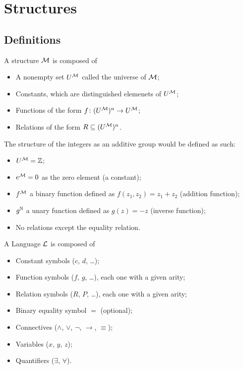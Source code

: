\documentclass[11pt,a4paper]{article}
\renewcommand{\implies}{\rightarrow}
\begin{document}
\section{Structures}
\subsection{Definitions}
\begin{definition}[Strcture]
  A structure $\mathcal{M}$ is composed of
  \begin{itemize}
    \item A nonempty set $U^{\mathcal{M}}$ called the universe of $\mathcal{M}$;
    \item Constants, which are distinguished elemenets of $U^{\mathcal{M}}$;
    \item Functions of the form $f \colon (U^{\mathcal{M}})^n \to U^{\mathcal{M}}$;
    \item Relations of the form $R \subseteq (U^{\mathcal{M}})^n$.
  \end{itemize}
\end{definition}

\begin{example}\label{example:group-structure}
  The structure of the integers as an additive group would be defined
  as such:
  \begin{itemize}
    \item $U^{\mathcal{M}} = \mathbb{Z}$;
    \item $e^{\mathcal{M}} = 0$ as the zero element (a constant);
    \item $f^{\mathcal{M}}$ a binary function defined as $f(z_1,z_2) = z_1 + z_2$ 
      (addition function);
    \item $g^{\mathbb{N}}$ a unary function defined as $g(z) = -z$ (inverse function);
    \item No relations except the equality relation.
  \end{itemize}
\end{example}

\begin{definition}[Language]
  A Language $\mathcal{L}$ is composed of
  \begin{itemize}
    \item Constant symbols ($c$, $d$, \dots);
    \item Function symbols ($f$, $g$, \dots), each one with a given arity;
    \item Relation symbols ($R$, $P$, \dots), each one with a given arity;
    \item Binary equality symbol $=$ (optional);
    \item Connectives ($\land$, $\lor$, $\neg$, $\implies$, $\equiv$);
    \item Variables ($x$, $y$, $z$);
    \item Quantifiers ($\exists$, $\forall$).
  \end{itemize}
\end{definition}
\end{document}
